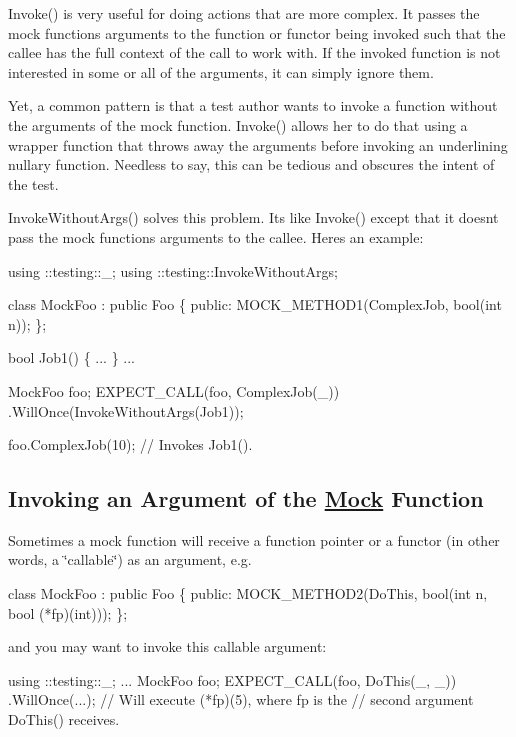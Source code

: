 {\ttfamily Invoke()} is very useful for doing actions that are more complex. It passes the mock function\textquotesingle{}s arguments to the function or functor being invoked such that the callee has the full context of the call to work with. If the invoked function is not interested in some or all of the arguments, it can simply ignore them.

Yet, a common pattern is that a test author wants to invoke a function without the arguments of the mock function. {\ttfamily Invoke()} allows her to do that using a wrapper function that throws away the arguments before invoking an underlining nullary function. Needless to say, this can be tedious and obscures the intent of the test.

{\ttfamily Invoke\+Without\+Args()} solves this problem. It\textquotesingle{}s like {\ttfamily Invoke()} except that it doesn\textquotesingle{}t pass the mock function\textquotesingle{}s arguments to the callee. Here\textquotesingle{}s an example\+:


\begin{DoxyCode}
using ::testing::\_;
using ::testing::InvokeWithoutArgs;

class MockFoo : public Foo \{
 public:
  MOCK\_METHOD1(ComplexJob, bool(int n));
\};

bool Job1() \{ ... \}
...

  MockFoo foo;
  EXPECT\_CALL(foo, ComplexJob(\_))
      .WillOnce(InvokeWithoutArgs(Job1));

  foo.ComplexJob(10);  // Invokes Job1().
\end{DoxyCode}


\subsection*{Invoking an Argument of the \hyperlink{class_mock}{Mock} Function}

Sometimes a mock function will receive a function pointer or a functor (in other words, a \char`\"{}callable\char`\"{}) as an argument, e.\+g.


\begin{DoxyCode}
class MockFoo : public Foo \{
 public:
  MOCK\_METHOD2(DoThis, bool(int n, bool (*fp)(int)));
\};
\end{DoxyCode}


and you may want to invoke this callable argument\+:


\begin{DoxyCode}
using ::testing::\_;
...
  MockFoo foo;
  EXPECT\_CALL(foo, DoThis(\_, \_))
      .WillOnce(...);
  // Will execute (*fp)(5), where fp is the
  // second argument DoThis() receives.
\end{DoxyCode}


